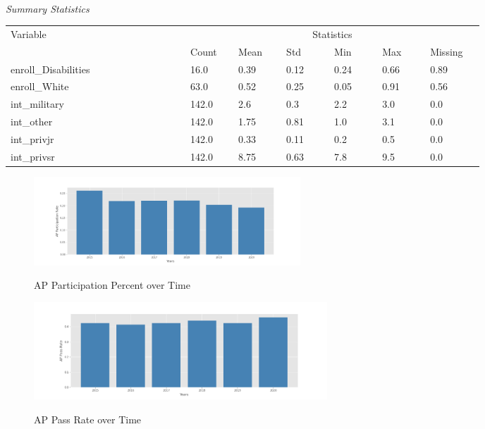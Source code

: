 \documentclass[10pt]{beamer}
\begin{document}
\begin{frame}
    \begin{threeparttable}
        \renewcommand\thetable{2}
        \caption{\\\textit{Summary Statistics}}
        \begin{tabular}{ p{0.3\linewidth} p{0.08\linewidth} p{0.08\linewidth} p{0.08\linewidth} p{0.08\linewidth} p{0.08\linewidth} p{0.09\linewidth}}
            \toprule
            Variable & \multicolumn{6}{c}{Statistics} \\
            \cmidrule(r){2-7}
            &    Count   &   Mean & Std & Min & Max & Missing  \\ 
            \midrule
            enroll\_Disabilities &  16.0  &  0.39 & 0.12 & 0.24 & 0.66 & 0.89  \\ 
            enroll\_White &  63.0  &  0.52 & 0.25 & 0.05 & 0.91 & 0.56  \\ 
            int\_military &  142.0  &  2.6 & 0.3 & 2.2 & 3.0 & 0.0  \\ 
            int\_other &  142.0  &  1.75 & 0.81 & 1.0 & 3.1 & 0.0  \\
            int\_privjr &  142.0  &  0.33 & 0.11 & 0.2 & 0.5 & 0.0  \\
            int\_privsr &  142.0  &  8.75 & 0.63 & 7.8 & 9.5 & 0.0  \\ 
            \midrule
        \end{tabular}
        \end{threeparttable}
\end{frame}

\begin{frame}{}
    \begin{figure}
        \caption{AP Participation Percent over Time}
        \includegraphics[width=10cm]{AP Participation Rate.png}
        \label{fig1}
    \end{figure}
\end{frame}

\begin{frame}{}
    \begin{figure}
        \caption{AP Pass Rate over Time}
        \includegraphics[width=11cm]{AP Pass Rate.png}
        \label{fig2}
    \end{figure}     
\end{frame}
    
\end{document}
